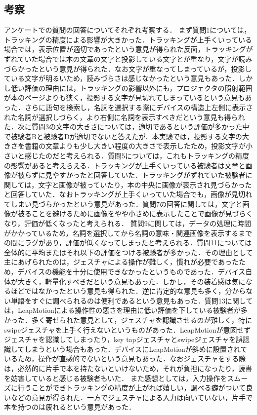 \subsection{考察}

アンケートでの質問の回答についてそれぞれ考察する．
まず質問1については，トラッキングの精度による影響が大きかった．トラッキングが上手くいっている場合では，表示位置が適切であったという意見が得られた反面，トラッキングがずれていた場合では本の文章の文字と投影している文字とが重なり，文字が読みづらかったという意見が得られた．なお文字が重なってしまっているが，投影している文字が明るいため，読みづらさは感じなかったという意見もあった．しかし低い評価の理由には，トラッキングの影響以外にも，プロジェクタの照射範囲が本のページよりも狭く，投影する文字が見切れてしまっているという意見もあった．さらに語句を検索し，名詞を選択する際にデバイスの構造上左側に表示された名詞が選択しづらく，より右側に名詞を表示すべきだという意見も得られた．次に質問3の文字の大きさについては，適切であるという評価が多かった中で被験者Bと被験者Dが適切でないと答えたが．本実験では，投影する文字の大きさを書籍の文章よりも少し大きい程度の大きさで表示したため，投影文字が小さいと感じたのだと考えられる．質問5については，これもトラッキングの精度の影響があると考えらえる．トラッキングが上手くいっている被験者は文章と画像が被らずに見やすかったと回答していた．トラッキングがずれていた被験者に関しては，文字と画像が被っていたり，本の中央に画像が表示され見づらかったと回答していた．なおトラッキングが上手くいっていた場合でも，画像が見切れてしまい見づらかったという意見があった．質問7の回答に関しては，文字と画像が被ることを避けるために画像をやや小さめに表示したことで画像が見づらくなり，評価が低くなったと考えられる．
質問9に関しては，データの処理に時間がかかっているため，名詞を選択してから名詞の意味・関連画像を表示するまでの間にラグがあり，評価が低くなってしまったと考えられる．質問11については全体的に平均またはそれ以下の評価をつける被験者が多かった．その理由として主にあげられたのは，ジェスチャによる操作が難しく，慣れが必要であったため，デバイスの機能を十分に使用できなかったというものであった．デバイス自体が大きく，軽量化すべきだという意見もあった．しかし，その装着感は気になるほどではなかったという意見も得られた．逆に肯定的な意見も多く，分からない単語をすぐに調べられるのは便利であるという意見もあった．質問13に関しては，LeapMotionによる操作性の悪さを理由に低い評価を下している被験者が多かった．多く寄せられた意見として，ジェスチャを認識させるのが難しく，特にswipeジェスチャを上手く行えないというものがあった．LeapMotionが意図せずジェスチャを認識してしまったり，key tapジェスチャとswipeジェスチャを誤認識してしまうという場合もあった．デバイスにLeapMotionが斜めに設置されているため，操作が直感的でないという意見もあった．なおジェスチャをする際は，必然的に片手で本を持たないといけないため，それが負担になったり，読書を妨害していると感じる被験者もいた．
また感想としては，入力操作をスムーズに行うことができトラッキングの精度が上がれば嬉しい，調べる癖がついて良いなどの意見が得られた．一方でジェスチャによる入力は向いていない，片手で本を持つのは疲れるという意見があった．


